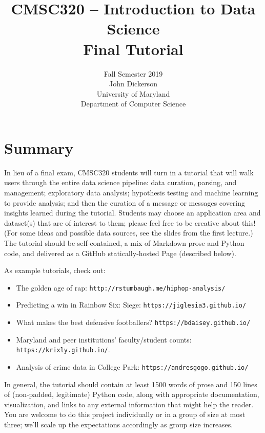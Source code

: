 \documentclass[11pt]{article}
\title{\vspace{-0.7in} CMSC320 -- Introduction to Data Science\\
\textbf{Final Tutorial}}
\author{Fall Semester 2019\\[.2in]
  John Dickerson\\
  University of Maryland\\
  Department of Computer Science}
\date{}
\begin{document}
\maketitle

\vspace{1in}

\section{Summary}
In lieu of a final exam, CMSC320 students will turn in a tutorial that will walk users through the entire data science pipeline: data curation, parsing, and management; exploratory data analysis; hypothesis testing and machine learning to provide analysis; and then the curation of a message or messages covering insights learned during the tutorial.  Students may choose an application area and dataset(s) that are of interest to them; please feel free to be creative about this!  (For some ideas and possible data sources, see the slides from the first lecture.)  The tutorial should be self-contained, a mix of Markdown prose and Python code, and delivered as a GitHub statically-hosted Page (described below).

As example tutorials, check out:
\begin{itemize}
\item The golden age of rap: \texttt{http://rstumbaugh.me/hiphop-analysis/}
\item Predicting a win in Rainbow Six: Siege: \texttt{https://jiglesia3.github.io/}
\item What makes the best defensive footballers?  \texttt{https://bdaisey.github.io/}
\item Maryland and peer institutions' faculty/student counts: \texttt{https://krixly.github.io/}.
\item Analysis of crime data in College Park: \texttt{https://andresgogo.github.io/}
\end{itemize}
In general, the tutorial should contain at least 1500 words of prose and 150 lines of (non-padded, legitimate) Python code, along with appropriate documentation, visualization, and links to any external information that might help the reader.  You are welcome to do this project individually or in a group of size at most three; we'll scale up the expectations accordingly as group size increases.
\end{document}
